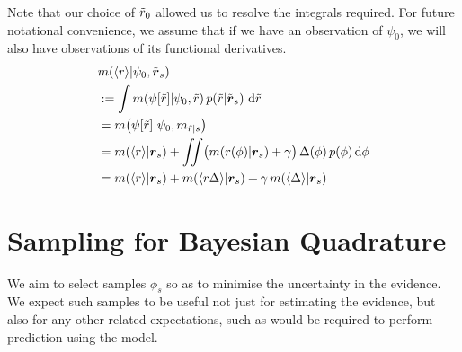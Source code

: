 \documentclass{article}
\begin{document}
Note that our choice of $\tr_0$ allowed us to resolve the integrals required. For future notational convenience, we assume that if we have an observation of $\psi_0$, we will also have observations of its functional derivatives.
%
\begin{align}
& \mean{\inty{r}}{\psi_0,\tvr_s} \nonumber\\
& \deq \int \mean{\psi[\tr]}{\psi_0,\tr}
\p{\tr}{\tvr_s}\, \ud \tr 
\nonumber\\
& = \mean{\psi[\tr]}{\psi_0,m_{\tr|s}} \nonumber\\
& = \mean{\inty{r}}{\vr_s} + \iint \bigl(\mean{r(\phi)}{\vr_s}+\gamma\bigr)\,\Delta(\phi)\,\po{\phi}\ud\phi
\nonumber\\
& = \mean{\inty{r}}{\vr_s} + \mean{\inty{r \Delta}}{\vr_s} + \gamma\, \mean{\inty{ \Delta}}{\vr_s}
\label{eq:mean_ev}
\end{align}

\section{Sampling for Bayesian Quadrature}

We aim to select samples $\phi_s$ so as to minimise the uncertainty in the evidence. We expect such samples to be useful not just for estimating the evidence, but also for any other related expectations, such as would be required to perform prediction using the model.
\end{document}
